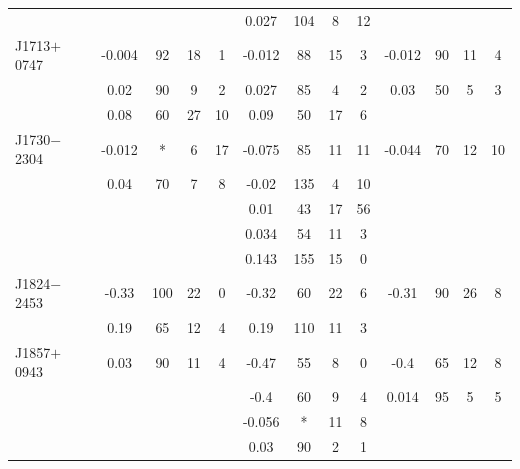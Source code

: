 \documentclass[useAMS,usenatbib]{mn2e}
\begin{document}
\begin{table}
\begin{tabular}{lcccccccccccc}
                &        &            &       &      & 0.027  &  104       & 8       & 12      &        &            &        &       \\
J1713$+$0747    & -0.004 & 92         & 18    & 1    & -0.012 &  88        & 15      & 3       & -0.012 &  90        &  11    &  4    \\
                &  0.02  & 90         & 9     & 2    & 0.027  &  85        & 4       & 2       & 0.03   &  50        &  5     &  3    \\
                &  0.08  & 60         & 27    & 10   & 0.09   &  50        & 17      & 6       &        &            &        &       \\
J1730$-$2304    & -0.012 & *          & 6     & 17   & -0.075 &  85        & 11      & 11      & -0.044 &  70        &  12    &  10   \\
                & 0.04   & 70         & 7     & 8    & -0.02  &  135       & 4       & 10      &        &            &        &       \\
                &        &            &       &      & 0.01   &  43        & 17      & 56      &        &            &        &       \\
                &        &            &       &      & 0.034  &  54        & 11      & 3       &        &            &        &       \\
                &        &            &       &      & 0.143  &  155       & 15      & 0       &        &            &        &       \\
J1824$-$2453    & -0.33  & 100        & 22    & 0    & -0.32  &  60        & 22      & 6       & -0.31  &  90        &  26    &  8    \\
                & 0.19   & 65         & 12    & 4    & 0.19   &  110       & 11      & 3       &        &            &        &       \\
J1857$+$0943    & 0.03   & 90         & 11    & 4    & -0.47  &  55        & 8       & 0       & -0.4   &  65        &  12    &  8    \\
                &        &            &       &      & -0.4   &  60        & 9       & 4       & 0.014  &  95        &  5     &  5    \\
                &        &            &       &      & -0.056 & *          & 11      & 8       &        &            &        &       \\
                &        &            &       &      & 0.03   & 90         & 2       & 1       &        &            &        &       \\

\end{tabular}
\end{table}
\end{document}
